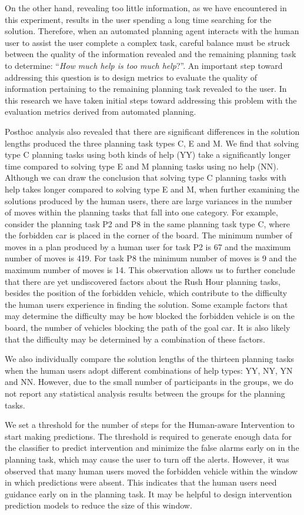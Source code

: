 On the other hand, revealing too little information, as we have encountered in this experiment, results in the user spending a long time searching for the solution.
Therefore, when an automated planning agent interacts with the human user to assist the user complete a complex task, careful balance must be struck between the quality of the information revealed and the remaining planning task to determine: ``\textit{How much help is too much help}?''.
An important step toward addressing this question is to design metrics to evaluate the quality of information pertaining to the remaining planning task revealed to the user.
In this research we have taken initial steps toward addressing this problem with the evaluation metrics derived from automated planning.
 
Posthoc analysis also revealed that there are significant differences in the solution lengths produced the three planning task types C, E and M.
We find that solving type C planning tasks using both kinds of help (YY) take a significantly longer time compared to solving type E and M planning tasks using no help (NN).
Although we can draw the conclusion that solving type C planning tasks with help takes longer compared to solving type E and M, when further examining the solutions produced by the human users, there are large variances in the number of moves within the planning tasks that fall into one category.
For example, consider the planning task P2 and P8 in the same planning task type C, where the forbidden car is placed in the corner of the board.
The minimum number of moves in a plan produced by a human user for task P2 is 67 and the maximum number of moves is 419.
For task P8 the minimum number of moves is 9 and the maximum number of moves is 14.
This observation allows us to further conclude that there are yet undiscovered factors  about the Rush Hour planning tasks, besides the position of the forbidden vehicle, which contribute to the difficulty the human users experience in finding the solution.
Some example factors that may determine the difficulty may be how blocked the forbidden vehicle is on the board, the number of vehicles blocking the path of the goal car.
It is also likely that the difficulty may be determined by a combination of these factors.

We also individually compare the solution lengths of the thirteen planning tasks when the human users adopt different combinations of help types: YY, NY, YN and NN.
However, due to the small number of participants in the groups, we do not report any statistical analysis results between the groups for the planning tasks.

We set a threshold for the number of steps for the Human-aware Intervention to start making predictions. 
The threshold is required to generate enough data for the classifier to predict intervention and minimize the false alarms early on in the planning task, which may cause the user to turn off the alerts.
However, it was observed that many human users moved the forbidden vehicle within the window in which predictions were absent.
This indicates that the human users need guidance early on in the planning task.
It may be helpful to design intervention prediction models to reduce the size of this window.